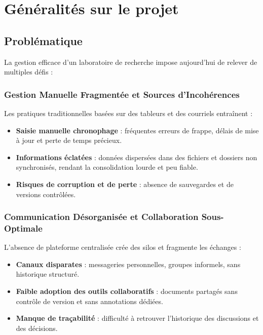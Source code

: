 \documentclass[12pt]{rapportPfe}
\begin{document}

\chapter{Généralités sur le projet}

\section{Problématique}
La gestion efficace d’un laboratoire de recherche impose aujourd’hui de relever de multiples défis :

\subsection{Gestion Manuelle Fragmentée et Sources d’Incohérences}
Les pratiques traditionnelles basées sur des tableurs et des courriels entraînent :
\begin{itemize}[itemsep=1em]
  \item \textbf{Saisie manuelle chronophage} : fréquentes erreurs de frappe, délais de mise à jour et perte de temps précieux.
  \item \textbf{Informations éclatées} : données dispersées dans des fichiers et dossiers non synchronisés, rendant la consolidation lourde et peu fiable.
  \item \textbf{Risques de corruption et de perte} : absence de sauvegardes et de versions contrôlées.
\end{itemize}

\subsection{Communication Désorganisée et Collaboration Sous-Optimale}
L’absence de plateforme centralisée crée des silos et fragmente les échanges :
\begin{itemize}[itemsep=1em]
  \item \textbf{Canaux disparates} : messageries personnelles, groupes informels, sans historique structuré.
  \item \textbf{Faible adoption des outils collaboratifs} : documents partagés sans contrôle de version et sans annotations dédiées.
  \item \textbf{Manque de traçabilité} : difficulté à retrouver l’historique des discussions et des décisions.
\end{itemize}
\end{document}
